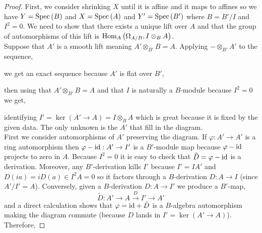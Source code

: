 \documentclass[12pt]{article}
\begin{document}
\begin{proof}
First, we consider shrinking $X$ until it is affine and it maps to affines so we have $Y = \mathrm{Spec}\left( B \right)$ and $X = \mathrm{Spec}\left( A \right)$ and $Y' = \mathrm{Spec}\left( B' \right)$ where $B = B'/I$ and $I^2 = 0$. We need to show that there exists a unique lift over $A$ and that the group of automorphisms of this lift is $\mathrm{Hom}_{A} \left( \Omega_{A/B}, I \otimes_{B} A \right)$. 
\bigskip\\
Suppose that $A'$ is a smooth lift meaning $A' \otimes_{B'} B = A$. Applying $- \otimes_{B'} A'$ to the sequence,
\begin{center}
\end{center}
we get an exact sequence because $A'$ is flat over $B'$,
\begin{center}
\end{center}
then using that $A' \otimes_{B'} B = A$ and that $I$ is naturally a $B$-module because $I^2 = 0$ we get,
\begin{center}
\end{center}
identifying $I' = \ker{(A' \to A)} = I \otimes_B A$ which is great because it is fixed by the given data. The only unknown is the $A'$ that fill in the diagram. 
\bigskip\\
First we consider automorphisms of $A'$ preserving the diagram. If $\varphi : A' \to A'$ is a ring automorphism then $\varphi - \mathrm{id} : A' \to I'$ is a $B'$-module map because $\varphi - \mathrm{id}$ projects to zero in $A$. Because $I^2 = 0$ it is easy to check that $\tilde{D} = \varphi - \mathrm{id}$ is a derivation. Moreover, any $B'$-derivation kills $I'$ because $I' = IA'$ and $D(i a) = i D(a) \in I^2 A = 0$ so it factors through a $B$-derivation $D : A \to I$ (since $A'/I' = A$). Conversely, given a $B$-derivation $D : A \to I'$ we produce a $B'$-map,
\[ \tilde{D} : A' \to A \xrightarrow{D} I' \to A' \]
and a direct calculation shows that $\varphi = \mathrm{id} + \tilde{D}$ is a $B$-algebra automorphism making the diagram commute (because $D$ lands in $I' = \ker{(A' \to A)}$). Therefore,

\end{proof}
\end{document}
